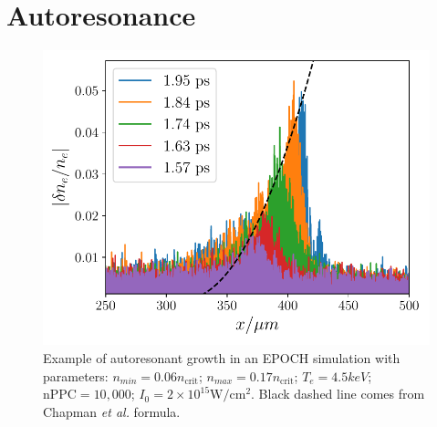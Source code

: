 \section{Autoresonance}

\begin{figure}[ht]
    \centering
    \includegraphics[width=0.8\columnwidth]{Chapters/C2_Theory/AR_diagnostic.pdf}
    \caption{Example of autoresonant growth in an EPOCH simulation with parameters: $n_{min} = 0.06 n_{\text{crit}}$; $n_{max} = 0.17 n_{\text{crit}}$; $T_e = 4.5\si{keV}$; $\text{nPPC}=10,000$; $I_0 = 2 \times 10^{15}\si{\watt / \centi\metre^2}$. Black dashed line comes from Chapman \textit{et al.} \citep{Chapman2012} formula.}
    \label{fig:AR_diagnostic}
\end{figure}{}

%
%
